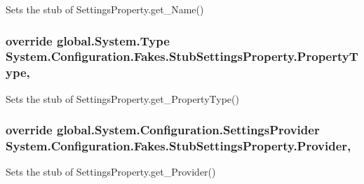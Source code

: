 Sets the stub of Settings\-Property.\-get\-\_\-\-Name()

\hypertarget{class_system_1_1_configuration_1_1_fakes_1_1_stub_settings_property_a2dcf6ac75e302d26af20ab3c70441a97}{
\subsubsection[{Property\-Type}]{\setlength{\rightskip}{0pt plus 5cm}override global.\-System.\-Type System.\-Configuration.\-Fakes.\-Stub\-Settings\-Property.\-Property\-Type\hspace{0.3cm}{\ttfamily [get]}, {\ttfamily [set]}}}\label{class_system_1_1_configuration_1_1_fakes_1_1_stub_settings_property_a2dcf6ac75e302d26af20ab3c70441a97}


Sets the stub of Settings\-Property.\-get\-\_\-\-Property\-Type()

\hypertarget{class_system_1_1_configuration_1_1_fakes_1_1_stub_settings_property_ae0e9b081c1d641c684b713777a8d3970}{
\subsubsection[{Provider}]{\setlength{\rightskip}{0pt plus 5cm}override global.\-System.\-Configuration.\-Settings\-Provider System.\-Configuration.\-Fakes.\-Stub\-Settings\-Property.\-Provider\hspace{0.3cm}{\ttfamily [get]}, {\ttfamily [set]}}}\label{class_system_1_1_configuration_1_1_fakes_1_1_stub_settings_property_ae0e9b081c1d641c684b713777a8d3970}


Sets the stub of Settings\-Property.\-get\-\_\-\-Provider()

